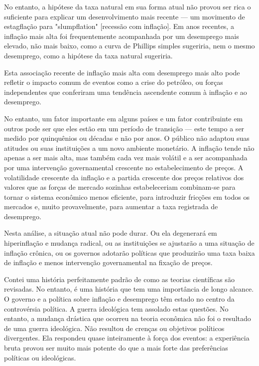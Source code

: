 \documentclass[12pt]{article}
\begin{document}
No entanto, a hipótese da taxa natural em sua forma atual não provou ser rica o suficiente para explicar um desenvolvimento mais recente — um movimento de estagflação para "slumpflation" [recessão com inflação]. Em anos recentes, a inflação mais alta foi frequentemente acompanhada por um desemprego mais elevado, não mais baixo, como a curva de Phillips simples sugeriria, nem o mesmo desemprego, como a hipótese da taxa natural sugeriria.

Esta associação recente de inflação mais alta com desemprego mais alto pode refletir o impacto comum de eventos como a crise do petróleo, ou forças independentes que conferiram uma tendência ascendente comum à inflação e ao desemprego.

No entanto, um fator importante em alguns países e um fator contribuinte em outros pode ser que eles estão em um período de transição — este tempo a ser medido por quinquênios ou décadas e não por anos. O público não adaptou suas atitudes ou suas instituições a um novo ambiente monetário. A inflação tende não apenas a ser mais alta, mas também cada vez mais volátil e a ser acompanhada por uma intervenção governamental crescente no estabelecimento de preços. A volatilidade crescente da inflação e a partida crescente dos preços relativos dos valores que as forças de mercado sozinhas estabeleceriam combinam-se para tornar o sistema econômico menos eficiente, para introduzir fricções em todos os mercados e, muito provavelmente, para aumentar a taxa registrada de desemprego.

Nesta análise, a situação atual não pode durar. Ou ela degenerará em hiperinflação e mudança radical, ou as instituições se ajustarão a uma situação de inflação crônica, ou os governos adotarão políticas que produzirão uma taxa baixa de inflação e menos intervenção governamental na fixação de preços.

Contei uma história perfeitamente padrão de como as teorias científicas são revisadas. No entanto, é uma história que tem uma importância de longo alcance. O governo e a política sobre inflação e desemprego têm estado no centro da controvérsia política. A guerra ideológica tem assolado estas questões. No entanto, a mudança drástica que ocorreu na teoria econômica não foi o resultado de uma guerra ideológica. Não resultou de crenças ou objetivos políticos divergentes. Ela respondeu quase inteiramente à força dos eventos: a experiência bruta provou ser muito mais potente do que a mais forte das preferências políticas ou ideológicas.
\end{document}
